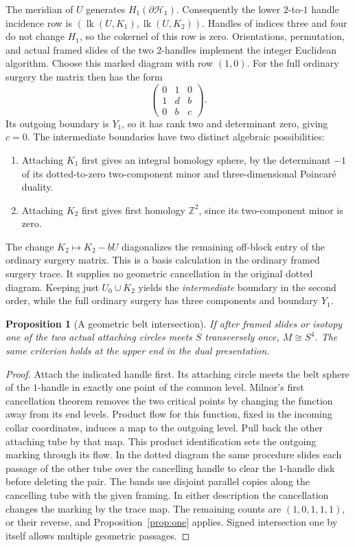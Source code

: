 \documentclass[11pt,letterpaper]{article}
\numberwithin{equation}{section}
\newtheorem{proposition}[theorem]{Proposition}
\DeclareMathOperator{\lk}{lk}
\newcommand{\HB}[1]{\mathcal H_{#1}}
\begin{document}
The meridian of \(U\) generates \(H_1(\partial\HB{1})\).
Consequently the lower \(2\)-to-\(1\) handle incidence row is
\((\lk(U,K_1),\lk(U,K_2))\). Handles of indices three and four
do not change \(H_1\), so the cokernel of this row is zero.
Orientations, permutation, and actual framed slides of the two
\(2\)-handles implement the integer Euclidean algorithm. Choose
this marked diagram with row \((1,0)\). For the full ordinary
surgery the matrix then has the form
\[
 \begin{pmatrix}0&1&0\\1&d&b\\0&b&c\end{pmatrix}.
\]
Its outgoing boundary is \(Y_1\), so it has rank two and
determinant zero, giving \(c=0\). The intermediate boundaries
have two distinct algebraic possibilities:
\begin{enumerate}
\item Attaching \(K_1\) first gives an integral homology sphere,
by the determinant \(-1\) of its dotted-to-zero two-component minor
and three-dimensional Poincar\'e duality.
\item Attaching \(K_2\) first gives first homology \(\mathbb Z^2\),
since its two-component minor is zero.
\end{enumerate}
The change \(K_2\mapsto K_2-bU\) diagonalizes the remaining
off-block entry of the ordinary surgery matrix. This is a basis
calculation in the ordinary framed surgery trace. It supplies no
geometric cancellation in the original dotted diagram. Keeping just
\(U_0\cup K_2\) yields the \emph{intermediate} boundary in the
second order, while the full ordinary surgery has three components
and boundary \(Y_1\).

\begin{proposition}[A geometric belt intersection]\label{prop:belt}
If after framed slides or isotopy one of the two actual attaching
circles meets \(S\) transversely once, \(M\cong S^4\). The same
criterion holds at the upper end in the dual presentation.
\end{proposition}

\begin{proof}
Attach the indicated handle first. Its attaching circle meets the
belt sphere of the \(1\)-handle in exactly one point of the common
level. Milnor's first cancellation theorem removes the two critical
points by changing the function away from its end levels. Product
flow for this function, fixed in the incoming collar coordinates,
induces a map to the outgoing level. Pull back the other attaching
tube by that map. This product identification sets the outgoing
marking through its flow. In the dotted diagram the same procedure
slides each passage of the other tube
over the cancelling handle to clear the \(1\)-handle disk before
deleting the pair. The bands use disjoint parallel copies along
the cancelling tube with the given framing. In either description
the cancellation changes the marking by the trace map. The
remaining counts are \((1,0,1,1,1)\), or their reverse, and
Proposition~\ref{prop:one} applies. Signed intersection one by
itself allows multiple geometric passages.
\end{proof}
\end{document}
